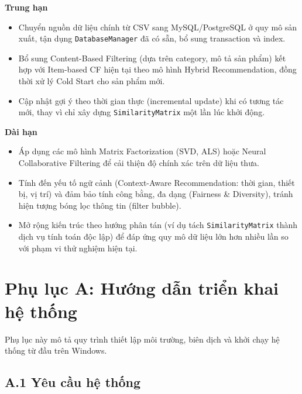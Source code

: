 \documentclass{report}
\begin{document}
\vspace{0.3cm}
\textbf{Trung hạn}
\begin{itemize}
    \item Chuyển nguồn dữ liệu chính từ CSV sang MySQL/PostgreSQL ở quy mô sản xuất, tận dụng \texttt{DatabaseManager} đã có sẵn, bổ sung transaction và index.
    \item Bổ sung Content-Based Filtering (dựa trên category, mô tả sản phẩm) kết hợp với Item-based CF hiện tại theo mô hình Hybrid Recommendation, đồng thời xử lý Cold Start cho sản phẩm mới.
    \item Cập nhật gợi ý theo thời gian thực (incremental update) khi có tương tác mới, thay vì chỉ xây dựng \texttt{SimilarityMatrix} một lần lúc khởi động.
\end{itemize}

\vspace{0.3cm}
\textbf{Dài hạn}
\begin{itemize}
    \item Áp dụng các mô hình Matrix Factorization (SVD, ALS) hoặc Neural Collaborative Filtering để cải thiện độ chính xác trên dữ liệu thưa.
    \item Tính đến yếu tố ngữ cảnh (Context-Aware Recommendation: thời gian, thiết bị, vị trí) và đảm bảo tính công bằng, đa dạng (Fairness \& Diversity), tránh hiện tượng bóng lọc thông tin (filter bubble).
    \item Mở rộng kiến trúc theo hướng phân tán (ví dụ tách \texttt{SimilarityMatrix} thành dịch vụ tính toán độc lập) để đáp ứng quy mô dữ liệu lớn hơn nhiều lần so với phạm vi thử nghiệm hiện tại.
\end{itemize}

\nocite{*}



\appendix
\chapter*{Phụ lục A: Hướng dẫn triển khai hệ thống}
\label{app:deployment}

Phụ lục này mô tả quy trình thiết lập môi trường, biên dịch và khởi chạy hệ thống từ đầu trên Windows.

\section*{A.1 Yêu cầu hệ thống}
\end{document}
